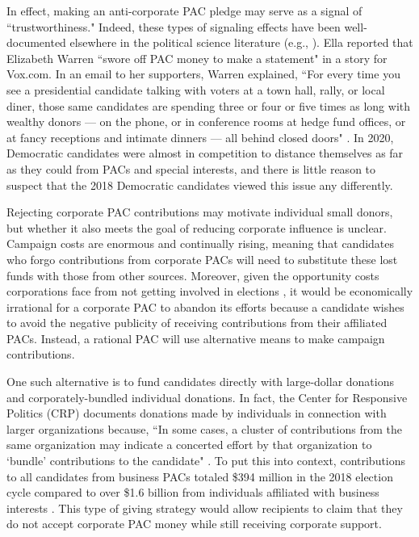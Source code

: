 \documentclass[12pt]{article}
\begin{document}
In effect, making an anti-corporate PAC pledge may serve as a signal of ``trustworthiness." Indeed, these types of signaling effects have been well-documented elsewhere in the political science literature (e.g., \citet{iyengar1989}). Ella \citet{nilsen2019} reported that Elizabeth Warren ``swore off PAC money to make a statement" in a story for Vox.com. In an email to her supporters, Warren explained, ``For every time you see a presidential candidate talking with voters at a town hall, rally, or local diner, those same candidates are spending three or four or five times as long with wealthy donors — on the phone, or in conference rooms at hedge fund offices, or at fancy receptions and intimate dinners — all behind closed doors" \citep{nilsen2019}. In 2020, Democratic candidates were almost in competition to distance themselves as far as they could from PACs and special interests, and there is little reason to suspect that the 2018 Democratic candidates viewed this issue any differently. 

Rejecting corporate PAC contributions may motivate individual small donors, but whether it also meets the goal of reducing corporate influence is unclear. Campaign costs are enormous and continually rising, meaning that candidates who forgo contributions from corporate PACs will need to substitute these lost funds with those from other sources. Moreover, given the opportunity costs corporations face from not getting involved in elections \citep{denzau1986, kroszner1998}, it would be economically irrational for a corporate PAC to abandon its efforts because a candidate wishes to avoid the negative publicity of receiving contributions from their affiliated PACs. Instead, a rational PAC will use alternative means to make campaign contributions. 

One such alternative is to fund candidates directly with large-dollar donations and corporately-bundled individual donations. In fact, the Center for Responsive Politics (CRP) documents donations made by individuals in connection with larger organizations because, ``In some cases, a cluster of contributions from the same organization may indicate a concerted effort by that organization to `bundle' contributions to the candidate" \citep{opensecrets.org}. To put this into context, contributions to all candidates from business PACs totaled \$394 million in the 2018 election cycle compared to over \$1.6 billion from individuals affiliated with business interests \citep{opensecrets.org2021}. This type of giving strategy would allow recipients to claim that they do not accept corporate PAC money while still receiving corporate support. 
\end{document}
